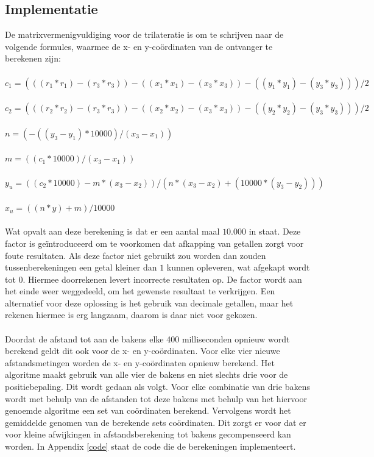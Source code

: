 \documentclass{article}
\begin{document}
\subsection{Implementatie}
De matrixvermenigvuldiging voor de trilateratie is om te schrijven naar de volgende formules, waarmee de x- en y-co\"ordinaten van de ontvanger te berekenen zijn: \\
\\
\indent$c_1 = (((r_1*r_1)-(r_3*r_3))-((x_1*x_1)-(x_3*x_3))-((y_1*y_1)-(y_3*y_3)))/2 $\\
\\
\indent$c_2 = (((r_2*r_2)-(r_3*r_3))-((x_2*x_2)-(x_3*x_3))-((y_2*y_2)-(y_3*y_3)))/2 $\\
\\
\indent$n =(-((y_3-y_1)*10000)/(x_3-x_1)) $\\
\\
\indent$m = ((c_1*10000)/(x_3-x_1)) $\\
\\
\indent$y_u = ((c_2*10000) - m*(x_3-x_2))/(n*(x_3-x_2) + (10000*(y_3-y_2))) $\\
\\
\indent$x_u = ((n*y)+m)/10000 $\\
\\
Wat opvalt aan deze berekening is dat er een aantal maal $10.000$ in staat. Deze factor is ge\"introduceerd om te voorkomen dat afkapping van getallen zorgt voor foute resultaten. Als deze factor niet gebruikt zou worden dan zouden tussenberekeningen een getal kleiner dan $1$ kunnen opleveren, wat afgekapt wordt tot $0$.  Hiermee doorrekenen levert incorrecte resultaten op. De factor wordt aan het einde weer weggedeeld, om het gewenste resultaat te verkrijgen. Een alternatief voor deze oplossing is het gebruik van decimale getallen, maar het rekenen hiermee is erg langzaam, daarom is daar niet voor gekozen.\\
\\
Doordat de afstand tot aan de bakens elke 400 milliseconden opnieuw wordt berekend geldt dit ook voor de x- en y-co\"{o}rdinaten. Voor elke vier nieuwe afstandsmetingen worden de x- en y-co\"ordinaten opnieuw berekend. Het algoritme maakt gebruik van alle vier de bakens en niet slechts drie voor de positiebepaling. Dit wordt gedaan als volgt. Voor elke combinatie van drie bakens wordt met behulp van de afstanden tot deze bakens met behulp van het hiervoor genoemde algoritme een set van co\"ordinaten berekend. Vervolgens wordt het gemiddelde genomen van de berekende sets co\"ordinaten. Dit zorgt er voor dat er voor kleine afwijkingen in afstandsberekening tot bakens gecompenseerd kan worden. In Appendix \ref{code} staat de code die de berekeningen implementeert.
\end{document}

